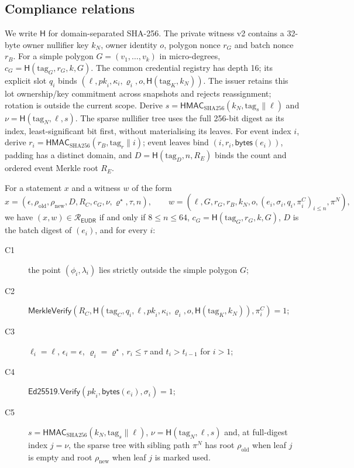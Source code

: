 \documentclass[runningheads]{llncs}
\newcommand{\Hs}{\mathsf{H}}
\newcommand{\cG}{c_{G}}
\newcommand{\RC}{R_{C}}
\newcommand{\rhoo}{\rho_{\mathrm{old}}}
\newcommand{\rhon}{\rho_{\mathrm{new}}}
\newcommand{\Rel}{\mathcal{R}_{\mathsf{EUDR}}}
\begin{document}
\subsection{Compliance relations}
We write $\Hs$ for domain-separated SHA-256. The private witness v2 contains a 32-byte owner nullifier key $k_N$, owner identity $o$, polygon nonce $r_G$ and batch nonce $r_B$. For a simple polygon $G=(v_1,\dots,v_k)$ in micro-degrees, $\cG=\Hs(\text{tag}_G,r_G,k,G)$. The common credential registry has depth 16; its explicit slot $q_i$ binds $(\ell,\mathit{pk}_i,\kappa_i,\varrho_i,o,\Hs(\text{tag}_K,k_N))$. The issuer retains this lot ownership/key commitment across snapshots and rejects reassignment; rotation is outside the current scope. Derive $s=\mathsf{HMAC}_{\mathrm{SHA256}}(k_N,\text{tag}_s\|\ell)$ and $\nu=\Hs(\text{tag}_N,\ell,s)$. The sparse nullifier tree uses the full 256-bit digest as its index, least-significant bit first, without materialising its leaves. For event index $i$, derive $r_i=\mathsf{HMAC}_{\mathrm{SHA256}}(r_B,\text{tag}_r\|i)$; event leaves bind $(i,r_i,\mathsf{bytes}(e_i))$, padding has a distinct domain, and $D=\Hs(\text{tag}_D,n,R_E)$ binds the count and ordered event Merkle root $R_E$.
\begin{definition}\label{def:rel}
For a statement $x$ and a witness $w$ of the form
\[
x=(\epsilon,\rhoo,\rhon,D,\RC,\cG,\nu,\varrho^\star,\tau,n),\qquad w=(\ell,G,r_G,r_B,k_N,o,(e_i,\sigma_i,q_i,\pi^C_i)_{i\le n},\pi^N),
\]
we have $(x,w)\in\Rel$ if and only if $8\le n\le 64$, $\cG=\Hs(\text{tag}_G,r_G,k,G)$, $D$ is the batch digest of $(e_i)$, and for every $i$:
\begin{description}
\item[C1] the point $(\phi_i,\lambda_i)$ lies strictly outside the simple polygon $G$;
\item[C2] $\mathsf{MerkleVerify}(\RC,\Hs(\text{tag}_C,q_i,\ell,\mathit{pk}_i,\kappa_i,\varrho_i,o,\Hs(\text{tag}_K,k_N)),\pi^C_i)=1$;
\item[C3] $\ell_i=\ell$, $\epsilon_i=\epsilon$, $\varrho_i=\varrho^\star$, $r_i\le\tau$ and $t_i>t_{i-1}$ for $i>1$;
\item[C4] $\mathsf{Ed25519.Verify}(\mathit{pk}_i,\mathsf{bytes}(e_i),\sigma_i)=1$;
\item[C5] $s=\mathsf{HMAC}_{\mathrm{SHA256}}(k_N,\text{tag}_s\|\ell)$, $\nu=\Hs(\text{tag}_N,\ell,s)$ and, at full-digest index $j=\nu$, the sparse tree with sibling path $\pi^N$ has root $\rhoo$ when leaf $j$ is empty and root $\rhon$ when leaf $j$ is marked used.
\end{description}
\end{definition}
\end{document}
